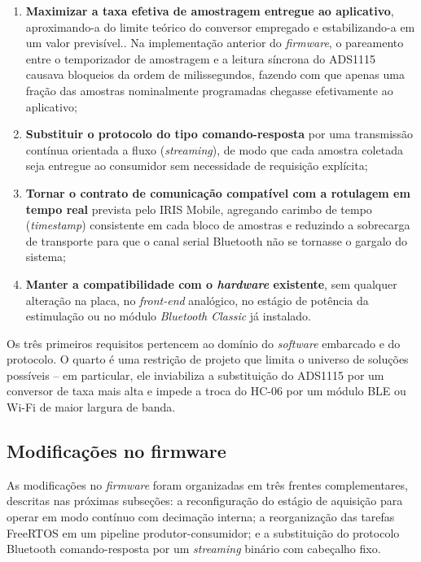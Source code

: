 \begin{enumerate}
    \item \textbf{Maximizar a taxa efetiva de amostragem entregue ao aplicativo}, aproximando-a do limite teórico do conversor empregado e estabilizando-a em um valor previsível.. Na implementação anterior do \textit{firmware}, o pareamento entre o temporizador de amostragem e a leitura síncrona do ADS1115 causava bloqueios da ordem de milissegundos, fazendo com que apenas uma fração das amostras nominalmente programadas chegasse efetivamente ao aplicativo;
    \item \textbf{Substituir o protocolo do tipo comando-resposta} por uma transmissão contínua orientada a fluxo (\textit{streaming}), de modo que cada amostra coletada seja entregue ao consumidor sem necessidade de requisição explícita;
    \item \textbf{Tornar o contrato de comunicação compatível com a rotulagem em tempo real} prevista pelo IRIS Mobile, agregando carimbo de tempo (\textit{timestamp}) consistente em cada bloco de amostras e reduzindo a sobrecarga de transporte para que o canal serial Bluetooth não se tornasse o gargalo do sistema;
    \item \textbf{Manter a compatibilidade com o \textit{hardware} existente}, sem qualquer alteração na placa, no \textit{front-end} analógico, no estágio de potência da estimulação ou no módulo \textit{Bluetooth Classic} já instalado.
\end{enumerate}

Os três primeiros requisitos pertencem ao domínio do \textit{software} embarcado e do protocolo. O quarto é uma restrição de projeto que limita o universo de soluções possíveis -- em particular, ele inviabiliza a substituição do ADS1115 por um conversor de taxa mais alta e impede a troca do HC-06 por um módulo BLE ou Wi-Fi de maior largura de banda.

\subsection{Modificações no firmware}\label{subsec:NEFirmware}

As modificações no \textit{firmware} foram organizadas em três frentes complementares, descritas nas próximas subseções: a reconfiguração do estágio de aquisição para operar em modo contínuo com decimação interna; a reorganização das tarefas FreeRTOS em um pipeline produtor-consumidor; e a substituição do protocolo Bluetooth comando-resposta por um \textit{streaming} binário com cabeçalho fixo.

